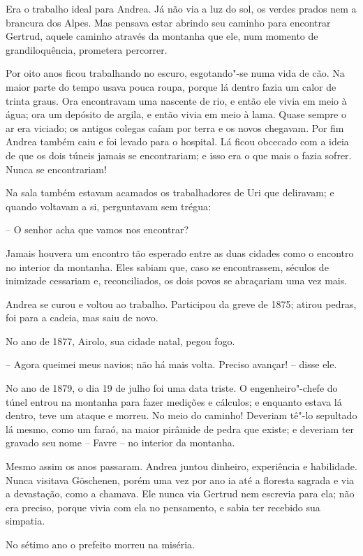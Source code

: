 Era o trabalho ideal para Andrea. Já não via a luz do sol, os verdes
prados nem a brancura dos Alpes. Mas pensava estar abrindo seu caminho
para encontrar Gertrud, aquele caminho através da montanha que ele, num
momento de grandiloquência, prometera percorrer.

Por oito anos ficou trabalhando no escuro, esgotando"-se numa vida de
cão. Na maior parte do tempo usava pouca roupa, porque lá dentro fazia
um calor de trinta graus. Ora encontravam uma nascente de rio, e então
ele vivia em meio à água; ora um depósito de argila, e então vivia em
meio à lama. Quase sempre o ar era viciado; os antigos colegas caíam
por terra e os novos chegavam. Por fim Andrea também caiu e foi levado
para o hospital. Lá ficou obcecado com a ideia de que os dois túneis
jamais se encontrariam; e isso era o que mais o fazia sofrer. Nunca se
encontrariam!

Na sala também estavam acamados os trabalhadores de Uri que deliravam; e
quando voltavam a si, perguntavam sem trégua:

-- O senhor acha que vamos nos encontrar?

Jamais houvera um encontro tão esperado entre as duas cidades como o
encontro no interior da montanha. Eles sabiam que, caso se
encontrassem, séculos de inimizade cessariam e, reconciliados, os dois
povos se abraçariam uma vez mais.

Andrea se curou e voltou ao trabalho. Participou da greve de 1875;
atirou pedras, foi para a cadeia, mas saiu de novo.

No ano de 1877, Airolo, sua cidade natal, pegou fogo.

-- Agora queimei meus navios; não há mais volta. Preciso avançar! -- disse
ele.

No ano de 1879, o dia 19 de julho foi uma data triste. O
engenheiro"-chefe do túnel entrou na montanha para fazer medições e
cálculos; e enquanto estava lá dentro, teve um ataque e morreu. 
No meio do caminho! Deveriam tê"-lo sepultado lá mesmo, como
um faraó, na maior pirâmide de pedra que existe; e deveriam ter gravado
seu nome -- Favre -- no interior da montanha.

Mesmo assim os anos passaram. Andrea juntou dinheiro, experiência e
habilidade. Nunca visitava Göschenen, porém uma vez por ano ia até a
floresta sagrada e via a devastação, como a chamava. Ele nunca via
Gertrud nem escrevia para ela; não era preciso, porque vivia com ela no
pensamento, e sabia ter recebido sua simpatia.

No sétimo ano o prefeito morreu na miséria.

